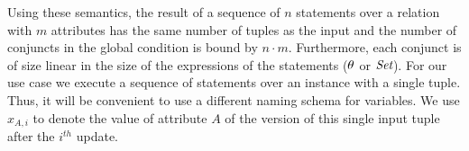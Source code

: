 Using these semantics, the result of a sequence of $n$ statements over a relation with $m$ attributes has the same number of tuples as the input and the number of conjuncts in the global condition is bound by $n \cdot m$. Furthermore,
each conjunct is of size linear in the size of the expressions of the statements ($\theta$ or $\textit{Set}$).
 For our use case we execute a sequence of statements over an instance with a single tuple. Thus, it will be convenient to use a different naming schema for variables. We use $x_{A,i}$ to denote the value of attribute $A$ of the version of this single input tuple after the $i^{th}$ update.

